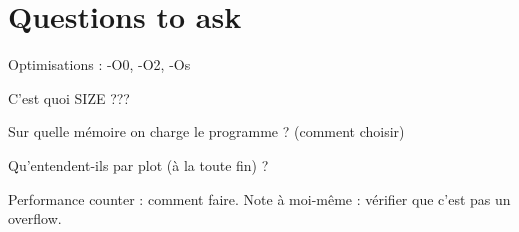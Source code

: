 \documentclass[a4paper,10pt]{article}
\begin{document}
\section{Questions to ask}

Optimisations : -O0, -O2, -Os

C'est quoi SIZE ???

Sur quelle mémoire on charge le programme ? (comment choisir)

Qu'entendent-ils par plot (à la toute fin) ?

Performance counter : comment faire. Note à moi-même : vérifier que c'est pas un overflow.







    
\end{document}
